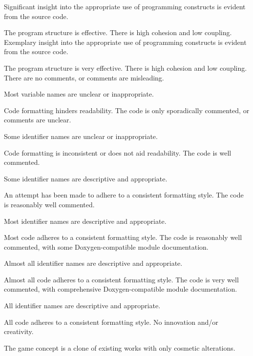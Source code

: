 \documentclass{../fal_assignment}
\begin{document}
\begin{markingrubric}
        \grade Significant insight into the appropriate use of programming constructs is evident from the source code.
            \par The program structure is effective. There is high cohesion and low coupling.
        \grade Exemplary insight into the appropriate use of programming constructs is evident from the source code.
            \par The program structure is very effective. There is high cohesion and low coupling.
        \grade\fail There are no comments, or comments are misleading.
            \par Most variable names are unclear or inappropriate.
            \par Code formatting hinders readability.
        \grade The code is only sporadically commented, or comments are unclear.
            \par Some identifier names are unclear or inappropriate.
            \par Code formatting is inconsistent or does not aid readability.
        \grade The code is well commented.
            \par Some identifier names are descriptive and appropriate.
            \par An attempt has been made to adhere to a consistent formatting style.
        \grade The code is reasonably well commented.
            \par Most identifier names are descriptive and appropriate.
            \par Most code adheres to a consistent formatting style.
        \grade The code is reasonably well commented, with some Doxygen-compatible module documentation.
            \par Almost all identifier names are descriptive and appropriate.
            \par Almost all code adheres to a consistent formatting style.
        \grade The code is very well commented, with comprehensive Doxygen-compatible module documentation.
            \par All identifier names are descriptive and appropriate.
            \par All code adheres to a consistent formatting style.
        \grade\fail No innovation and/or creativity.
            \par The game concept is a clone of existing works with only cosmetic alterations.

\end{markingrubric}
\end{document}
